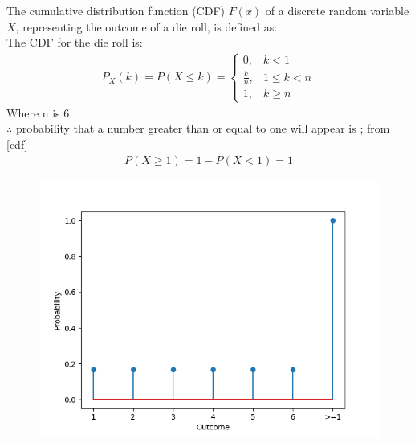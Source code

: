 \documentclass[journal]{IEEEtran}
\begin{document}
	The cumulative distribution function (CDF) \(F(x)\) of a discrete random variable \(X\), representing the outcome of a die roll, is defined as:\\
	The CDF for the die roll is:
	\begin{align}
		P_X(k) = P(X \leq k) =
		\begin{cases}
			0, & k < 1 \\
			\frac{k}{n}, & 1 \leq k < n\\
			1, & k \geq n
		\end{cases} \label{cdf}
	\end{align}
	Where n is 6. \\ 
	$\therefore$ probability that a number greater than or equal to one will
	appear is ; from \eqref{cdf}
	\begin{align}
		P(X \geq 1) = 1 - P(X < 1) = 1
	\end{align} 
	
	\begin{figure}[h!]
		\centering
		\includegraphics[width=\columnwidth]{figs/Fig.png}
		\label{stemplot}
	\end{figure}
	
\end{document}
